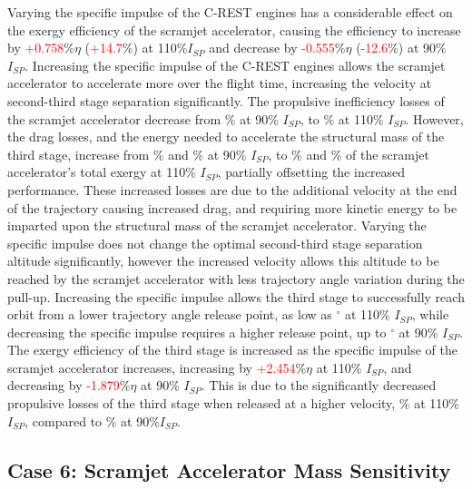 Varying the specific impulse of the C-REST engines has a considerable effect on the exergy efficiency of the scramjet accelerator, causing the efficiency to increase by \textcolor{red}{+0.758}\%$\eta$ (\textcolor{red}{+14.7}\%) at 110\%$I_{SP}$ and decrease by \textcolor{red}{-0.555}\%$\eta$ (\textcolor{red}{-12.6}\%) at 90\% $I_{SP}$. 
Increasing the specific impulse of the C-REST engines allows the scramjet accelerator to accelerate more over the flight time, increasing the velocity at second-third stage separation significantly. The propulsive inefficiency losses of the scramjet accelerator decrease from \PlosssecondIspNinetyNoReturn\% at 90\% $I_{SP}$, to \PlosssecondIspOneHundredTenNoReturn \% at 110\% $I_{SP}$. However, the drag losses, and the energy needed to accelerate the structural mass of the third stage, increase from \WDsecondIspNinetyNoReturn\% and \WsecondIspNinetyNoReturn\% at 90\% $I_{SP}$, to \WDsecondIspOneHundredTenNoReturn\% and \WsecondIspOneHundredTenNoReturn\% of the scramjet accelerator's total exergy at 110\% $I_{SP}$, partially offsetting the increased performance. These increased losses are due to the additional velocity at the end of the trajectory causing increased drag, and requiring more kinetic energy to be imparted upon the structural mass of the scramjet accelerator. 
 Varying the specific impulse does not change the optimal second-third stage separation altitude significantly, however the increased velocity allows this altitude to be reached by the scramjet accelerator with less trajectory angle variation during the pull-up. Increasing the specific impulse allows the third stage to successfully reach orbit from a lower trajectory angle release point, as low as \secondthirdSeparationgammaIspOneHundredTenNoReturn$^\circ$ at 110\% $I_{SP}$, while decreasing the specific impulse requires a higher release point, up to \secondthirdSeparationgammaIspNinetyNoReturn$^\circ$ at 90\% $I_{SP}$.
The exergy efficiency of the third stage is increased as the specific impulse of the scramjet accelerator increases, increasing by \textcolor{red}{+2.454}\%$\eta$ at 110\% $I_{SP}$, and decreasing by \textcolor{red}{-1.879}\%$\eta$ at 90\% $I_{SP}$. This is due to the significantly decreased propulsive losses of the third stage when released at a higher velocity, \PlossthreeIspOneHundredTenNoReturn\% at 110\%$I_{SP}$, compared to \PlossthreeIspNinetyNoReturn\% at 90\%$I_{SP}$. 

\subsection{Case 6: Scramjet Accelerator Mass Sensitivity}\label{sec:SpartanMassnoreturn}



